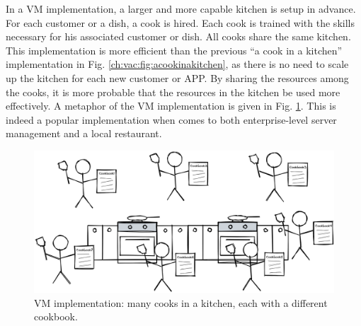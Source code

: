 In a VM implementation, a larger and more capable kitchen is setup in advance. For each customer or a dish, a cook is hired. Each cook is trained with the skills necessary for his associated customer or dish. All cooks share the same kitchen. This implementation is more efficient than the previous ``a cook in a kitchen'' implementation in Fig. \ref{ch:vac:fig:acookinakitchen}, as there is no need to scale up the kitchen for each new customer or APP. By sharing the resources among the cooks, it is more probable that the resources in the kitchen be used more effectively. A metaphor of the VM implementation is given in Fig. \ref{ch:vac:fig:manycooksinakitchen}. This is indeed a popular implementation when comes to both enterprise-level server management and a local restaurant.
\begin{figure}
	\centering \includegraphics[width=350pt]{chapters/ch-virtualization-and-containerization/figures/manycooksinakitchen.png}
	\caption{VM implementation: many cooks in a kitchen, each with a different cookbook.} \label{ch:vac:fig:manycooksinakitchen}
\end{figure}

